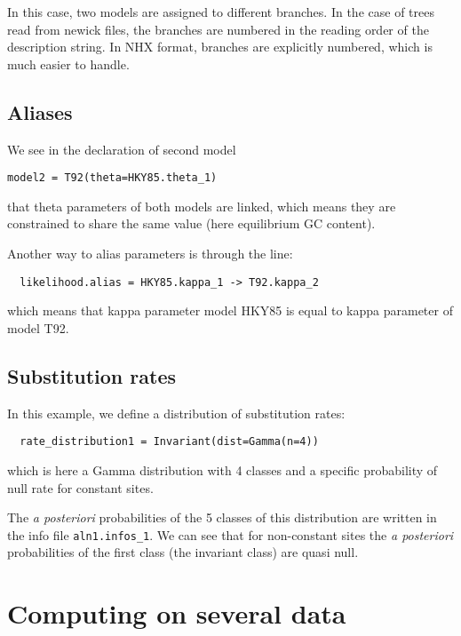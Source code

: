 \documentclass{article}
\begin{document}
In this case, two models are assigned to different branches. In the
case of trees read from newick files, the branches are numbered in the
reading order of the description string. In NHX format, branches are
explicitly numbered, which is much easier to handle.

\subsection*{Aliases}

We see in the declaration of second model

\begin{verbatim}
model2 = T92(theta=HKY85.theta_1)
\end{verbatim}

that theta parameters of both models are linked, which means they are
constrained to share the same value (here equilibrium GC content).

Another way to alias parameters is through the line:

\begin{verbatim}
  likelihood.alias = HKY85.kappa_1 -> T92.kappa_2
\end{verbatim}

which means that kappa parameter model HKY85 is equal to kappa
parameter of model T92.

\subsection*{Substitution rates}

In this example, we define a distribution of substitution rates:

\begin{verbatim}
  rate_distribution1 = Invariant(dist=Gamma(n=4))
\end{verbatim}

which is here a Gamma distribution with 4 classes and a specific
probability of null rate for constant sites.

The \textit{a posteriori} probabilities of the 5 classes of this
distribution are written in the info file \verb|aln1.infos_1|. We can
see that for non-constant sites the \textit{a posteriori}
probabilities of the first class (the invariant class) are quasi null.

\section{Computing on several data}
\end{document}
